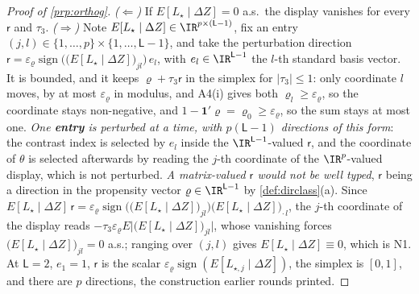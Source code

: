\begin{proof}[Proof of \cref{prp:orthog}]
\emph{($\Leftarrow$)} If $E[L_\star\mid\Delta Z]=0$ a.s.\ the display vanishes for every $\mathsf r$ and
$\tau_3$. \emph{($\Rightarrow$)} Note $E[L_\star\mid\Delta Z]\in\IR^{p\times(\mathsf L-1)}$, fix an
entry $(j,l)\in\{1,\dots,p\}\times\{1,\dots,\mathsf L-1\}$, and take the perturbation
direction $\mathsf r=\varepsilon_\varrho\operatorname{sign}\big(\big(E[L_\star\mid\Delta Z]\big)_{jl}\big)\,e_l$, with
$e_l\in\IR^{\mathsf L-1}$ the $l$-th standard basis vector. It is
bounded, and it keeps $\varrho+\tau_3\mathsf r$ in the simplex for $|\tau_3|\le1$: only coordinate $l$
moves, by at most $\varepsilon_\varrho$ in modulus, and A4(i) gives both
$\varrho_l\ge\varepsilon_\varrho$, so the coordinate stays non-negative, and
$1-\mathbf 1'\varrho=\varrho_0\ge\varepsilon_\varrho$, so the sum stays at most one.
\emph{One \textbf{entry} is perturbed at a time, with $p(\mathsf L-1)$ directions of this form}: the
contrast index is selected by $e_l$ inside the $\IR^{\mathsf L-1}$-valued $\mathsf r$, and the coordinate
of $\theta$ is selected afterwards by reading the $j$-th coordinate of the $\IR^{p}$-valued display, which
is not perturbed. \emph{A matrix-valued $\mathsf r$ would not be well typed}, $\mathsf r$ being a
direction in the propensity vector $\varrho\in\IR^{\mathsf L-1}$ by \cref{def:dirclass}(a).
Since $E[L_\star\mid\Delta Z]\,\mathsf r
=\varepsilon_\varrho\operatorname{sign}\big(\big(E[L_\star\mid\Delta Z]\big)_{jl}\big)\big(E[L_\star\mid\Delta Z]\big)_{\cdot\,l}$,
the $j$-th coordinate of the display reads
$-\tau_3\varepsilon_\varrho E\big|\big(E[L_\star\mid\Delta Z]\big)_{jl}\big|$, whose vanishing forces
$\big(E[L_\star\mid\Delta Z]\big)_{jl}=0$ a.s.; ranging over
$(j,l)$ gives $E[L_\star\mid\Delta Z]\equiv0$, which is N1.
At $\mathsf L=2$, $e_1=1$, $\mathsf r$ is the scalar
$\varepsilon_\varrho\operatorname{sign}(E[L_{\star,j}\mid\Delta Z])$, the simplex is $[0,1]$, and there are
$p$ directions, the construction earlier rounds printed.


\end{proof}
